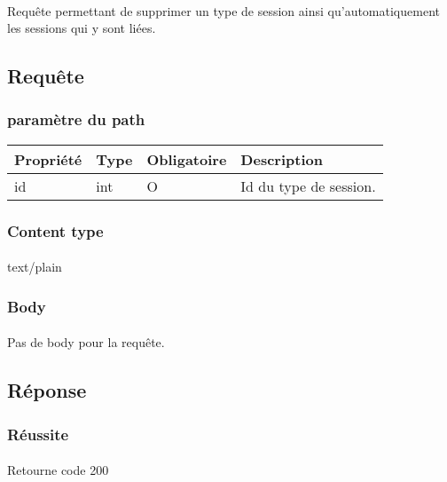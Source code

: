 \paragraph{}
	Requête permettant de supprimer un type de session ainsi qu'automatiquement les sessions qui y sont liées.

\subsection{Requête}
	\subsubsection{paramètre du path}
		\begin{center}
			\begin{tabularx}{\textwidth}{| T{0.2122\textwidth} | S{0.22\textwidth} | S{0.15\textwidth} | S{0.3\textwidth} |}
				\hline
				Propriété & Type & Obligatoire & Description \\
				\hline
				id & int & O & Id du type de session. \\
				\hline
			\end{tabularx}
		\end{center}
		
	\subsubsection{Content type}
		\paragraph{}
			text/plain
			
	\subsubsection{Body}
		\paragraph{}
			Pas de body pour la requête.

\subsection{Réponse}
	\subsubsection{Réussite}
		\paragraph{}
			Retourne code 200
			
